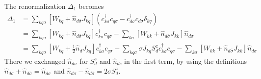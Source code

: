 The renormalization \(\Delta_1\) becomes
\begin{equation}\begin{aligned}
	\Delta_1 &=\sum_{kq\sigma}\left[W_{kq} + \hat n_{d\overline\sigma}J_{kq}\right] \left(c^\dagger_{k\sigma}c_{q\sigma} - c^\dagger_{d\sigma}c_{d\sigma}\delta_{kq}\right)\\
		 &=\sum_{kq\sigma}\left[W_{kq} + \hat n_{d\overline\sigma}J_{kq}\right]c^\dagger_{k\sigma}c_{q\sigma} - \sum_{k\sigma}\left[W_{kk} + \hat n_{d\overline\sigma}J_{kk}\right]\hat n_{d\sigma}\\
		 &=\sum_{kq\sigma}\left[W_{kq} + \frac{1}{2} \hat n_d J_{kq}\right]c^\dagger_{k\sigma}c_{q\sigma} - \sum_{kq\sigma}\sigma J_{kq} S_d^z c^\dagger_{k\sigma}c_{q\sigma}- \sum_{k\sigma}\left[W_{kk} + \hat n_{d\overline\sigma}J_{kk}\right]\hat n_{d\sigma}
\end{aligned}\end{equation}
There we exchanged \(\hat n_{d\overline\sigma}\) for \(S_d^z\) and \(\hat n_d\), in the first term, by using the definitions \(\hat n_{d\sigma} + \hat n_{d\overline\sigma} = \hat n_{d\sigma}\) and \(\hat n_{d\sigma} - \hat n_{d\overline\sigma} = 2\sigma S_d^z\).

